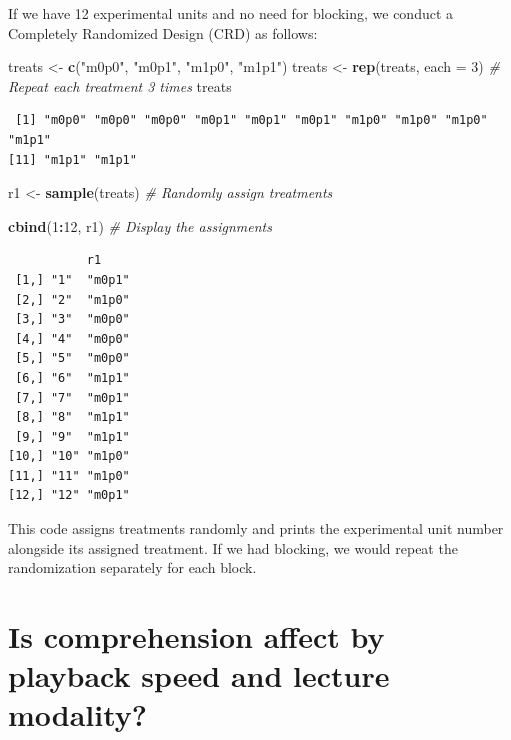 \documentclass[
  letterpaper,
]{book}
\newenvironment{Shaded}{\begin{snugshade}}{\end{snugshade}}
\newcommand{\AttributeTok}[1]{\textcolor[rgb]{0.13,0.29,0.53}{#1}}
\newcommand{\CommentTok}[1]{\textcolor[rgb]{0.56,0.35,0.01}{\textit{#1}}}
\newcommand{\DecValTok}[1]{\textcolor[rgb]{0.00,0.00,0.81}{#1}}
\newcommand{\FunctionTok}[1]{\textcolor[rgb]{0.13,0.29,0.53}{\textbf{#1}}}
\newcommand{\NormalTok}[1]{#1}
\newcommand{\OtherTok}[1]{\textcolor[rgb]{0.56,0.35,0.01}{#1}}
\newcommand{\SpecialCharTok}[1]{\textcolor[rgb]{0.81,0.36,0.00}{\textbf{#1}}}
\newcommand{\StringTok}[1]{\textcolor[rgb]{0.31,0.60,0.02}{#1}}
\begin{document}
If we have 12 experimental units and no need for blocking, we conduct a
Completely Randomized Design (CRD) as follows:

\begin{Shaded}
\begin{Highlighting}[]
\NormalTok{treats }\OtherTok{\textless{}{-}} \FunctionTok{c}\NormalTok{(}\StringTok{"m0p0"}\NormalTok{, }\StringTok{"m0p1"}\NormalTok{, }\StringTok{"m1p0"}\NormalTok{, }\StringTok{"m1p1"}\NormalTok{)}
\NormalTok{treats }\OtherTok{\textless{}{-}} \FunctionTok{rep}\NormalTok{(treats, }\AttributeTok{each =} \DecValTok{3}\NormalTok{)  }\CommentTok{\# Repeat each treatment 3 times}
\NormalTok{treats }
\end{Highlighting}
\end{Shaded}

\begin{verbatim}
 [1] "m0p0" "m0p0" "m0p0" "m0p1" "m0p1" "m0p1" "m1p0" "m1p0" "m1p0" "m1p1"
[11] "m1p1" "m1p1"
\end{verbatim}

\begin{Shaded}
\begin{Highlighting}[]
\NormalTok{r1 }\OtherTok{\textless{}{-}} \FunctionTok{sample}\NormalTok{(treats)  }\CommentTok{\# Randomly assign treatments}

\FunctionTok{cbind}\NormalTok{(}\DecValTok{1}\SpecialCharTok{:}\DecValTok{12}\NormalTok{, r1)  }\CommentTok{\# Display the assignments}
\end{Highlighting}
\end{Shaded}

\begin{verbatim}
           r1    
 [1,] "1"  "m0p1"
 [2,] "2"  "m1p0"
 [3,] "3"  "m0p0"
 [4,] "4"  "m0p0"
 [5,] "5"  "m0p0"
 [6,] "6"  "m1p1"
 [7,] "7"  "m0p1"
 [8,] "8"  "m1p1"
 [9,] "9"  "m1p1"
[10,] "10" "m1p0"
[11,] "11" "m1p0"
[12,] "12" "m0p1"
\end{verbatim}

This code assigns treatments randomly and prints the experimental unit
number alongside its assigned treatment. If we had blocking, we would
repeat the randomization separately for each block.

\section{Is comprehension affect by playback speed and lecture
modality?}\label{is-comprehension-affect-by-playback-speed-and-lecture-modality}
\end{document}
